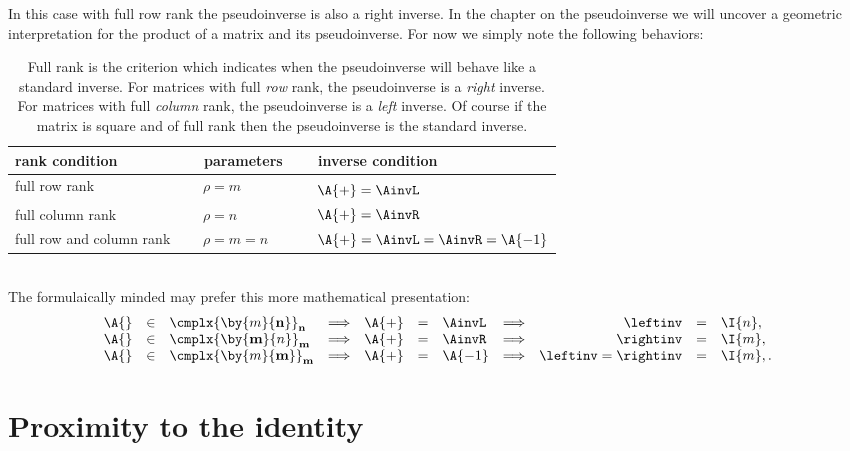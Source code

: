 In this case with full row rank the pseudoinverse is also a right inverse. In the chapter on the pseudoinverse we will uncover a geometric interpretation for the product of a matrix and its pseudoinverse. For now we simply note the following behaviors:
\begin{table}[htdp]
\begin{center}
\begin{tabular}{lll}
rank condition   & \ parameters \ & \ inverse condition\\\hline
full row rank    & \ $\rho = m $  & \ $\A{+} = \AinvL$ $\phantom{A^{-1^{-1^{-1}}}}$ \\[3pt]
full column rank & \ $\rho = n $  & \ $\A{+} = \AinvR$ \\[3pt]
full row and column rank \ & \ $\rho = m = n $ \ & \ $\A{+} = \AinvL = \AinvR = \A{-1}$ \\[13pt]
\end{tabular}
\end{center}
\label{tab:pmii:rank}
\caption[When the pseudoinverse will behave like a standard inverse]{Full rank is the criterion which indicates when the pseudoinverse will behave like a standard inverse. For matrices with full \textit{row} rank, the pseudoinverse is a \textit{right} inverse. For matrices with full \textit{column} rank, the pseudoinverse is a \textit{left} inverse. Of course if the matrix is square and of full rank then the pseudoinverse is the standard inverse.}
\end{table}%
\\
The formulaically minded may prefer this more mathematical presentation:
\begin{equation}
  \begin{array}{rclcrclcrcl}
     \A{}&\in&\cmplx{\by{m}{\textbf{n}}}_{\textbf{n}} & \Longrightarrow & \A{+} &=& \AinvL & \Longrightarrow & \leftinv &=& \I{n},\\
     \A{}&\in&\cmplx{\by{\textbf{m}}{n}}_{\textbf{m}} & \Longrightarrow & \A{+} &=& \AinvR & \Longrightarrow & \rightinv &=& \I{m},\\
     \A{}&\in&\cmplx{\by{m}{\textbf{m}}}_{\textbf{m}} & \Longrightarrow & \A{+} &=& \A{-1} & \Longrightarrow & \leftinv = \rightinv &=& \I{m},.\\
  \end{array}
\end{equation}

\section{Proximity to the identity}
\label{piproximity}

